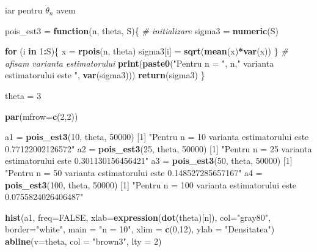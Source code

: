\documentclass[]{article}
\newenvironment{Shaded}{\begin{snugshade}}{\end{snugshade}}
\newcommand{\KeywordTok}[1]{\textcolor[rgb]{0.13,0.29,0.53}{\textbf{#1}}}
\newcommand{\DataTypeTok}[1]{\textcolor[rgb]{0.13,0.29,0.53}{#1}}
\newcommand{\DecValTok}[1]{\textcolor[rgb]{0.00,0.00,0.81}{#1}}
\newcommand{\StringTok}[1]{\textcolor[rgb]{0.31,0.60,0.02}{#1}}
\newcommand{\CommentTok}[1]{\textcolor[rgb]{0.56,0.35,0.01}{\textit{#1}}}
\newcommand{\OtherTok}[1]{\textcolor[rgb]{0.56,0.35,0.01}{#1}}
\newcommand{\ControlFlowTok}[1]{\textcolor[rgb]{0.13,0.29,0.53}{\textbf{#1}}}
\newcommand{\OperatorTok}[1]{\textcolor[rgb]{0.81,0.36,0.00}{\textbf{#1}}}
\newcommand{\NormalTok}[1]{#1}
\begin{document}
iar pentru \(\dot{\theta}_n\) avem

\begin{Shaded}
\begin{Highlighting}[]
\NormalTok{pois_est3 =}\StringTok{ }\ControlFlowTok{function}\NormalTok{(n, theta, S)\{}
  \CommentTok{# initializare}
\NormalTok{  sigma3 =}\StringTok{ }\KeywordTok{numeric}\NormalTok{(S)}
  
  \ControlFlowTok{for}\NormalTok{ (i }\ControlFlowTok{in} \DecValTok{1}\OperatorTok{:}\NormalTok{S)\{}
\NormalTok{    x =}\StringTok{ }\KeywordTok{rpois}\NormalTok{(n, theta)}
\NormalTok{    sigma3[i] =}\StringTok{ }\KeywordTok{sqrt}\NormalTok{(}\KeywordTok{mean}\NormalTok{(x)}\OperatorTok{*}\KeywordTok{var}\NormalTok{(x))}
\NormalTok{  \}}
  \CommentTok{# afisam varianta estimatorului}
  \KeywordTok{print}\NormalTok{(}\KeywordTok{paste0}\NormalTok{(}\StringTok{"Pentru n = "}\NormalTok{, n,}\StringTok{" varianta estimatorului este "}\NormalTok{, }\KeywordTok{var}\NormalTok{(sigma3)))}
  \KeywordTok{return}\NormalTok{(sigma3)}
\NormalTok{\}}

\NormalTok{theta =}\StringTok{ }\DecValTok{3}

\KeywordTok{par}\NormalTok{(}\DataTypeTok{mfrow=}\KeywordTok{c}\NormalTok{(}\DecValTok{2}\NormalTok{,}\DecValTok{2}\NormalTok{))}

\NormalTok{a1 =}\StringTok{ }\KeywordTok{pois_est3}\NormalTok{(}\DecValTok{10}\NormalTok{, theta, }\DecValTok{50000}\NormalTok{)}
\NormalTok{[}\DecValTok{1}\NormalTok{] }\StringTok{"Pentru n = 10 varianta estimatorului este 0.77122002126572"}
\NormalTok{a2 =}\StringTok{ }\KeywordTok{pois_est3}\NormalTok{(}\DecValTok{25}\NormalTok{, theta, }\DecValTok{50000}\NormalTok{)}
\NormalTok{[}\DecValTok{1}\NormalTok{] }\StringTok{"Pentru n = 25 varianta estimatorului este 0.301130156456421"}
\NormalTok{a3 =}\StringTok{ }\KeywordTok{pois_est3}\NormalTok{(}\DecValTok{50}\NormalTok{, theta, }\DecValTok{50000}\NormalTok{)}
\NormalTok{[}\DecValTok{1}\NormalTok{] }\StringTok{"Pentru n = 50 varianta estimatorului este 0.148527285657167"}
\NormalTok{a4 =}\StringTok{ }\KeywordTok{pois_est3}\NormalTok{(}\DecValTok{100}\NormalTok{, theta, }\DecValTok{50000}\NormalTok{)}
\NormalTok{[}\DecValTok{1}\NormalTok{] }\StringTok{"Pentru n = 100 varianta estimatorului este 0.0755824026406487"}


\KeywordTok{hist}\NormalTok{(a1, }\DataTypeTok{freq=}\OtherTok{FALSE}\NormalTok{, }\DataTypeTok{xlab=}\KeywordTok{expression}\NormalTok{(}\KeywordTok{dot}\NormalTok{(theta)[n]), }
     \DataTypeTok{col=}\StringTok{"gray80"}\NormalTok{, }\DataTypeTok{border=}\StringTok{"white"}\NormalTok{, }\DataTypeTok{main =} \StringTok{"n = 10"}\NormalTok{, }\DataTypeTok{xlim =} \KeywordTok{c}\NormalTok{(}\DecValTok{0}\NormalTok{,}\DecValTok{12}\NormalTok{),}
     \DataTypeTok{ylab =} \StringTok{"Densitatea"}\NormalTok{)}
\KeywordTok{abline}\NormalTok{(}\DataTypeTok{v=}\NormalTok{theta, }\DataTypeTok{col =} \StringTok{"brown3"}\NormalTok{, }\DataTypeTok{lty =} \DecValTok{2}\NormalTok{)}


\end{Highlighting}
\end{Shaded}
\end{document}
